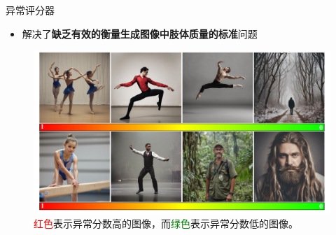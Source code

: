 \documentclass[
    fontset=fandol,
    xcolor=svgnames %
]{ctexbeamer}
\begin{document}
\begin{frame}

    \begin{alertblock}{异常评分器}
        \begin{itemize}
            \item 解决了\textbf{缺乏有效的衡量生成图像中肢体质量的标准}问题
        \end{itemize}
    \end{alertblock}
\begin{figure}
    \includegraphics[width=0.8\linewidth]{fig/abnormal-score-visualize.pdf}
    \caption{\textcolor{red}{红色}表示异常分数高的图像，而\textcolor{green}{绿色}表示异常分数低的图像。}

            \end{figure}
\end{frame}
\end{document}
